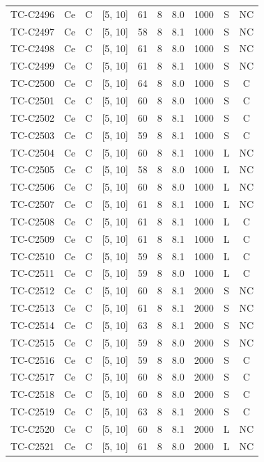 \begin{longtable}{lccccccccc}
TC-C2496 & Ce & C & [5, 10] & 61 & 8 & 8.0 & 1000 & S & NC \\
TC-C2497 & Ce & C & [5, 10] & 58 & 8 & 8.1 & 1000 & S & NC \\
TC-C2498 & Ce & C & [5, 10] & 61 & 8 & 8.0 & 1000 & S & NC \\
TC-C2499 & Ce & C & [5, 10] & 61 & 8 & 8.1 & 1000 & S & NC \\
TC-C2500 & Ce & C & [5, 10] & 64 & 8 & 8.0 & 1000 & S & C \\
TC-C2501 & Ce & C & [5, 10] & 60 & 8 & 8.0 & 1000 & S & C \\
TC-C2502 & Ce & C & [5, 10] & 60 & 8 & 8.1 & 1000 & S & C \\
TC-C2503 & Ce & C & [5, 10] & 59 & 8 & 8.1 & 1000 & S & C \\
TC-C2504 & Ce & C & [5, 10] & 60 & 8 & 8.1 & 1000 & L & NC \\
TC-C2505 & Ce & C & [5, 10] & 58 & 8 & 8.0 & 1000 & L & NC \\
TC-C2506 & Ce & C & [5, 10] & 60 & 8 & 8.0 & 1000 & L & NC \\
TC-C2507 & Ce & C & [5, 10] & 61 & 8 & 8.1 & 1000 & L & NC \\
TC-C2508 & Ce & C & [5, 10] & 61 & 8 & 8.1 & 1000 & L & C \\
TC-C2509 & Ce & C & [5, 10] & 61 & 8 & 8.1 & 1000 & L & C \\
TC-C2510 & Ce & C & [5, 10] & 59 & 8 & 8.1 & 1000 & L & C \\
TC-C2511 & Ce & C & [5, 10] & 59 & 8 & 8.0 & 1000 & L & C \\
TC-C2512 & Ce & C & [5, 10] & 60 & 8 & 8.1 & 2000 & S & NC \\
TC-C2513 & Ce & C & [5, 10] & 61 & 8 & 8.1 & 2000 & S & NC \\
TC-C2514 & Ce & C & [5, 10] & 63 & 8 & 8.1 & 2000 & S & NC \\
TC-C2515 & Ce & C & [5, 10] & 59 & 8 & 8.0 & 2000 & S & NC \\
TC-C2516 & Ce & C & [5, 10] & 59 & 8 & 8.0 & 2000 & S & C \\
TC-C2517 & Ce & C & [5, 10] & 60 & 8 & 8.0 & 2000 & S & C \\
TC-C2518 & Ce & C & [5, 10] & 60 & 8 & 8.0 & 2000 & S & C \\
TC-C2519 & Ce & C & [5, 10] & 63 & 8 & 8.1 & 2000 & S & C \\
TC-C2520 & Ce & C & [5, 10] & 60 & 8 & 8.1 & 2000 & L & NC \\
TC-C2521 & Ce & C & [5, 10] & 61 & 8 & 8.0 & 2000 & L & NC \\

\end{longtable}
